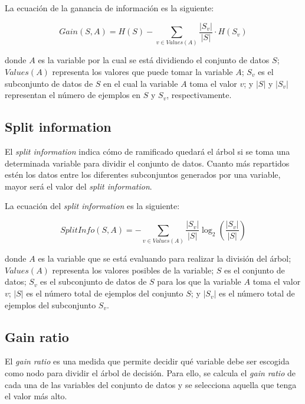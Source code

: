 La ecuación de la ganancia de información es la siguiente:

\begin{equation}
Gain(S, A) = H(S) - \sum_{v \in Values(A)} \frac{|S_v|}{|S|} \cdot H(S_v)
\label{eq:information_gain}
\end{equation}

donde $A$ es la variable por la cual se está dividiendo el conjunto de datos $S$; $Values(A)$ representa los valores que puede tomar la variable $A$; $S_v$ es el subconjunto de datos de $S$ en el cual la variable $A$ toma el valor $v$; y $|S|$ y $|S_v|$ representan el número de ejemplos en $S$ y $S_v$, respectivamente.

\subsection{\textbf{Split information}}

El \textit{split information} \cite{1996ContinuousC45} indica cómo de ramificado quedará el árbol si se toma una determinada variable para dividir el conjunto de datos. Cuanto más repartidos estén los datos entre los diferentes subconjuntos generados por una variable, mayor será el valor del \textit{split information}.

La ecuación del \textit{split information} es la siguiente:

\begin{equation}
SplitInfo(S, A) = -\sum_{v \in Values(A)} \frac{|S_v|}{|S|} \log_2 \left( \frac{|S_v|}{|S|} \right)
\label{eq:split_info}
\end{equation}

donde $A$ es la variable que se está evaluando para realizar la división del árbol; $Values(A)$ representa los valores posibles de la variable; $S$ es el conjunto de datos; $S_v$ es el subconjunto de datos de $S$ para los que la variable $A$ toma el valor $v$; $|S|$ es el número total de ejemplos del conjunto $S$; y $|S_v|$ es el número total de ejemplos del subconjunto $S_v$.

\subsection{\textbf{Gain ratio}}

El \textit{gain ratio} \cite{1996ContinuousC45} es una medida que permite decidir qué variable debe ser escogida como nodo para dividir el árbol de decisión. Para ello, se calcula el \textit{gain ratio} de cada una de las variables del conjunto de datos y se selecciona aquella que tenga el valor más alto.

